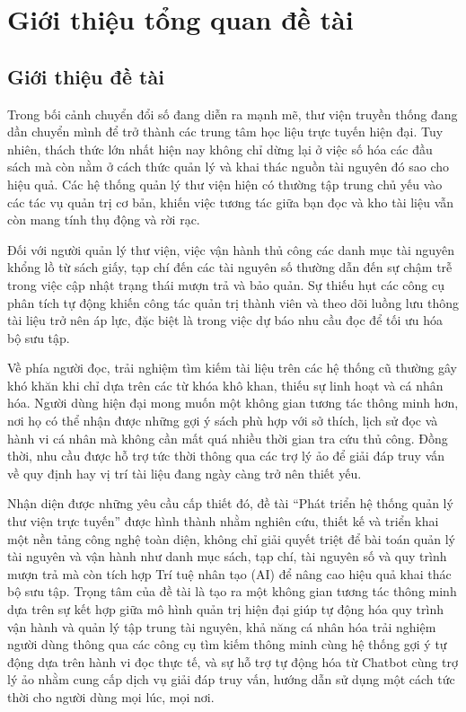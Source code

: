 \section{Giới thiệu tổng quan đề tài}

\subsection{Giới thiệu đề tài}

Trong bối cảnh chuyển đổi số đang diễn ra mạnh mẽ, thư viện truyền thống đang dần chuyển mình để trở thành các trung tâm học liệu trực tuyến hiện đại. Tuy nhiên, thách thức lớn nhất hiện nay không chỉ dừng lại ở việc số hóa các đầu sách mà còn nằm ở cách thức quản lý và khai thác nguồn tài nguyên đó sao cho hiệu quả. Các hệ thống quản lý thư viện hiện có thường tập trung chủ yếu vào các tác vụ quản trị cơ bản, khiến việc tương tác giữa bạn đọc và kho tài liệu vẫn còn mang tính thụ động và rời rạc.

Đối với người quản lý thư viện, việc vận hành thủ công các danh mục tài nguyên khổng lồ từ sách giấy, tạp chí đến các tài nguyên số thường dẫn đến sự chậm trễ trong việc cập nhật trạng thái mượn trả và bảo quản. Sự thiếu hụt các công cụ phân tích tự động khiến công tác quản trị thành viên và theo dõi luồng lưu thông tài liệu trở nên áp lực, đặc biệt là trong việc dự báo nhu cầu đọc để tối ưu hóa bộ sưu tập.

Về phía người đọc, trải nghiệm tìm kiếm tài liệu trên các hệ thống cũ thường gây khó khăn khi chỉ dựa trên các từ khóa khô khan, thiếu sự linh hoạt và cá nhân hóa. Người dùng hiện đại mong muốn một không gian tương tác thông minh hơn, nơi họ có thể nhận được những gợi ý sách phù hợp với sở thích, lịch sử đọc và hành vi cá nhân mà không cần mất quá nhiều thời gian tra cứu thủ công. Đồng thời, nhu cầu được hỗ trợ tức thời thông qua các trợ lý ảo để giải đáp truy vấn về quy định hay vị trí tài liệu đang ngày càng trở nên thiết yếu.

Nhận diện được những yêu cầu cấp thiết đó, đề tài “Phát triển hệ thống quản lý thư viện trực tuyến” được hình thành nhằm nghiên cứu, thiết kế và triển khai một nền tảng công nghệ toàn diện, không chỉ giải quyết triệt để bài toán quản lý tài nguyên và vận hành như danh mục sách, tạp chí, tài nguyên số và quy trình mượn trả mà còn tích hợp Trí tuệ nhân tạo (AI) để nâng cao hiệu quả khai thác bộ sưu tập. Trọng tâm của đề tài là tạo ra một không gian tương tác thông minh dựa trên sự kết hợp giữa mô hình quản trị hiện đại giúp tự động hóa quy trình vận hành và quản lý tập trung tài nguyên, khả năng cá nhân hóa trải nghiệm người dùng thông qua các công cụ tìm kiếm thông minh cùng hệ thống gợi ý tự động dựa trên hành vi đọc thực tế, và sự hỗ trợ tự động hóa từ Chatbot cùng trợ lý ảo nhằm cung cấp dịch vụ giải đáp truy vấn, hướng dẫn sử dụng một cách tức thời cho người dùng mọi lúc, mọi nơi.

